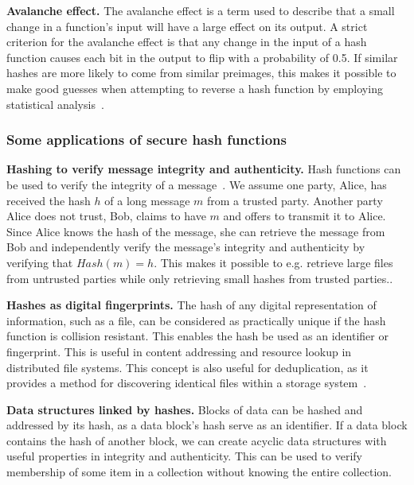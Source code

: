 \noindent
{\bf Avalanche effect.}
The avalanche effect is a term used to describe that a small change in a function's input will have a large effect on its output. A strict criterion for the avalanche effect is that any change in the input of a hash function causes each bit in the output to flip with a probability of 0.5. If similar hashes are more likely to come from similar preimages, this makes it possible to make good guesses when attempting to reverse a hash function by employing statistical analysis~\cite{wang_cryptanalysis_2005}.

\subsubsection{Some applications of secure hash functions}

\noindent
{\bf Hashing to verify message integrity and authenticity.}
Hash functions can be used to verify the integrity of a message~\cite[p.~158--164]{lindell2014introduction}. We assume one party, Alice, has received the hash $h$ of a long message $m$ from a trusted party. Another party Alice does not trust, Bob, claims to have $m$ and offers to transmit it to Alice. Since Alice knows the hash of the message, she can retrieve the message from Bob and independently verify the message's integrity and authenticity by verifying that $Hash(m) = h$. This makes it possible to e.g. retrieve large files from untrusted parties while only retrieving small hashes from trusted parties..

\noindent
{\bf Hashes as digital fingerprints.}
The hash of any digital representation of information, such as a file, can be considered as practically unique if the hash function is collision resistant. This enables the hash be used as an identifier or fingerprint. This is useful in content addressing and resource lookup in distributed file systems. This concept is also useful for deduplication, as it provides a method for discovering identical files within a storage system~\cite[p.~182-183]{lindell2014introduction}. 

\noindent
{\bf Data structures linked by hashes.}
Blocks of data can be hashed and addressed by its hash, as a data block's hash serve as an identifier. If a data block contains the hash of another block, we can create acyclic data structures with useful properties in integrity and authenticity. This can be used to verify membership of some item in a collection without knowing the entire collection.


